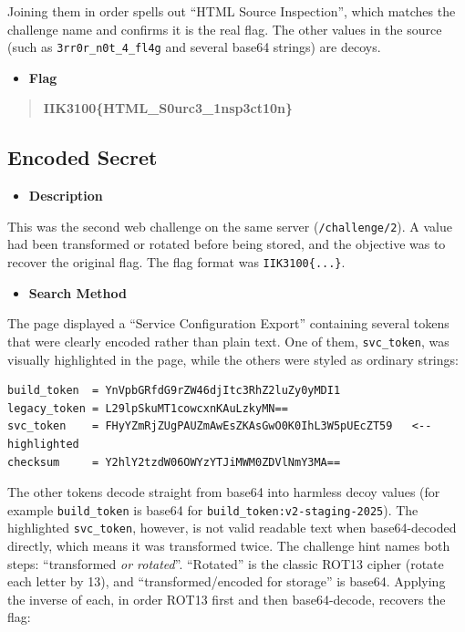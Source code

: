 \documentclass[11pt]{article}
\begin{document}
\noindent Joining them in order spells out ``HTML Source Inspection'', which matches the challenge name and confirms it is the real flag. The other values in the source (such as \texttt{3rr0r\_n0t\_4\_fl4g} and several base64 strings) are decoys.

\begin{itemize}[leftmargin=1.5em]
    \item \textbf{Flag}
\end{itemize}
\begin{quote}
\textbf{IIK3100\{HTML\_S0urc3\_1nsp3ct10n\}}
\end{quote}

\subsection{Encoded Secret}

\begin{itemize}[leftmargin=1.5em]
    \item \textbf{Description}
\end{itemize}
\noindent This was the second web challenge on the same server (\texttt{/challenge/2}). A value had been transformed or rotated before being stored, and the objective was to recover the original flag. The flag format was \texttt{IIK3100\{...\}}.

\begin{itemize}[leftmargin=1.5em]
    \item \textbf{Search Method}
\end{itemize}
\noindent The page displayed a ``Service Configuration Export'' containing several tokens that were clearly encoded rather than plain text. One of them, \texttt{svc\_token}, was visually highlighted in the page, while the others were styled as ordinary strings:

\begin{verbatim}
build_token  = YnVpbGRfdG9rZW46djItc3RhZ2luZy0yMDI1
legacy_token = L29lpSkuMT1cowcxnKAuLzkyMN==
svc_token    = FHyYZmRjZUgPAUZmAwEsZKAsGwO0K0IhL3W5pUEcZT59   <-- highlighted
checksum     = Y2hlY2tzdW06OWYzYTJiMWM0ZDVlNmY3MA==
\end{verbatim}

\noindent The other tokens decode straight from base64 into harmless decoy values (for example \texttt{build\_token} is base64 for \texttt{build\_token:v2-staging-2025}). The highlighted \texttt{svc\_token}, however, is not valid readable text when base64-decoded directly, which means it was transformed twice. The challenge hint names both steps: ``transformed \emph{or rotated}''. ``Rotated'' is the classic ROT13 cipher (rotate each letter by 13), and ``transformed/encoded for storage'' is base64. Applying the inverse of each, in order ROT13 first and then base64-decode, recovers the flag:
\end{document}
